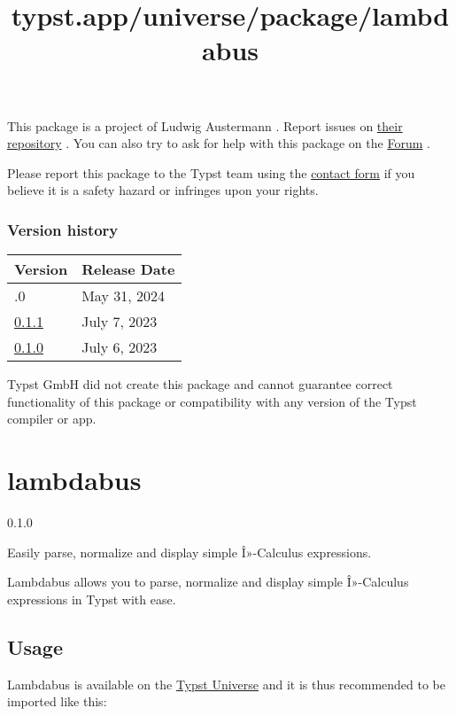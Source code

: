 This package is a project of Ludwig Austermann . Report issues on
\href{https://github.com/ludwig-austermann/typst-ouset}{their
repository} . You can also try to ask for help with this package on the
\href{https://forum.typst.app}{Forum} .

Please report this package to the Typst team using the
\href{https://typst.app/contact}{contact form} if you believe it is a
safety hazard or infringes upon your rights.

\label{versions}
\subsubsection{Version history}\label{version-history}

\begin{longtable}[]{@{}ll@{}}
\toprule\noalign{}
Version & Release Date \\
\midrule\noalign{}
\endhead
\bottomrule\noalign{}
\endlastfoot
0.2.0 & May 31, 2024 \\
\href{https://typst.app/universe/package/ouset/0.1.1/}{0.1.1} & July 7,
2023 \\
\href{https://typst.app/universe/package/ouset/0.1.0/}{0.1.0} & July 6,
2023 \\
\end{longtable}

Typst GmbH did not create this package and cannot guarantee correct
functionality of this package or compatibility with any version of the
Typst compiler or app.


\title{typst.app/universe/package/lambdabus}

\label{banner}
\section{lambdabus}\label{lambdabus}

{ 0.1.0 }

Easily parse, normalize and display simple Î»-Calculus expressions.

\label{readme}
Lambdabus allows you to parse, normalize and display simple Î»-Calculus
expressions in Typst with ease.

\subsection{Usage}\label{usage}

Lambdabus is available on the
\href{https://typst.app/universe/package/lambdabus/}{Typst Universe} and
it is thus recommended to be imported like this:

